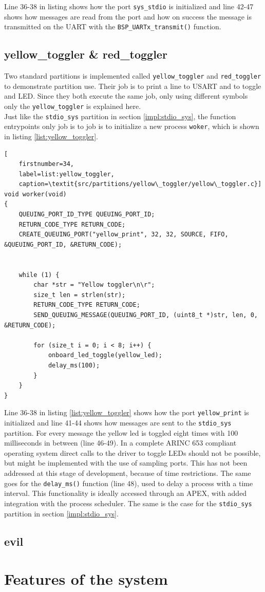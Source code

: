 Line 36-38 in listing shows how the port \texttt{sys\_stdio} is initialized and line
42-47 shows how messages are read from the port and how on success the message
is transmitted on the UART with the \texttt{BSP\_UARTx\_transmit()} function.


\subsection{yellow\_toggler & red\_toggler}
Two standard partitions is implemented called \texttt{yellow\_toggler} and
\texttt{red\_toggler} to demonstrate partition use. Their job is to print a line
to USART and to toggle and LED. Since they both execute the same job, only using
different symbols only the \texttt{yellow\_toggler} is explained here.\\

Just like the \texttt{stdio\_sys} partition in section \ref{impl:stdio_sys}, the
function entrypoints only job is to job is to initialize a new process
\texttt{woker}, which is shown in listing \ref{list:yellow_toggler}.

\begin{minipage}{\linewidth}
\begin{lstlisting}[
	firstnumber=34,
	label=list:yellow_toggler,
	caption=\textit{src/partitions/yellow\_toggler/yellow\_toggler.c}]
void worker(void)
{
    QUEUING_PORT_ID_TYPE QUEUING_PORT_ID;
    RETURN_CODE_TYPE RETURN_CODE;
    CREATE_QUEUING_PORT("yellow_print", 32, 32, SOURCE, FIFO, &QUEUING_PORT_ID, &RETURN_CODE);


    while (1) {
        char *str = "Yellow toggler\n\r";
        size_t len = strlen(str);
        RETURN_CODE_TYPE RETURN_CODE;
        SEND_QUEUING_MESSAGE(QUEUING_PORT_ID, (uint8_t *)str, len, 0, &RETURN_CODE);

        for (size_t i = 0; i < 8; i++) {
            onboard_led_toggle(yellow_led);
            delay_ms(100);
        }
    }
}
\end{lstlisting}
\end{minipage}

Line 36-38 in listing \ref{list:yellow_toggler} shows how the port
\texttt{yellow\_print} is initialized and line 41-44 shows how messages are sent
to the \texttt{stdio\_sys} partition. For every message the yellow led is
toggled eight times with 100 milliseconds in between (line 46-49). In a complete
ARINC 653 compliant operating system direct calls to the driver to toggle LEDs
should not be possible, but might be implemented with the use of sampling ports.
This has not been addressed at this stage of development, because of time
restrictions. The same goes for the \texttt{delay\_ms()} function (line 48),
used to delay a process with a time interval. This functionality is ideally
accessed through an APEX, with added integration with the process scheduler.
The same is the case for the \texttt{stdio\_sys} partition in section
\ref{impl:stdio_sys}.

\subsection{evil}


\section{Features of the system}
